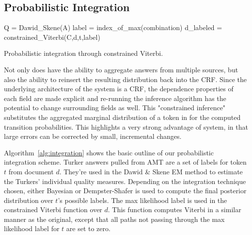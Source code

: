 \subsection{Probabilistic Integration}

\begin{algorithm}[fillcomment]
\label{alg:integration}
\BlankLine
{}\;
Q = Dawid\_Skene(A)\;
\;
\;
label = index\_of\_max(combination)\;
d\_labeled = constrained\_Viterbi(C,d,t,label)\;

\caption{Probabilistic integration through constrained Viterbi.}
\end{algorithm}

Not only does \sysName have the ability to aggregate answers from multiple sources, but also the ability to reinsert the resulting distribution back into the CRF. Since the underlying architecture of the system is a CRF, the dependence properties of each field are made explicit and re-running the inference algorithm has the potential to change surrounding fields as well.  This "constrained inference" substitutes the aggregated marginal distribution of a token in for the computed transition probabilities.  This highlights a very strong advantage of \sysName system, in that large errors can be corrected by small, incremental changes.

Algorithm~\ref{alg:integration} shows the basic outline of our probabilistic integration scheme.  Turker answers pulled from AMT are a set of labels for token $t$ from document $d$.  They're used in the Dawid \& Skene EM method to estimate the Turkers' individual quality measures.  Depending on the integration technique chosen, either Bayesian or Dempster-Shafer is used to compute the final posterior distribution over $t$'s possible labels.  The max likelihood label is used in the constrained Viterbi function over $d$.  This function computes Viterbi in a similar manner as the original, except that all paths not passing through the max likelihood label for $t$ are set to zero.


